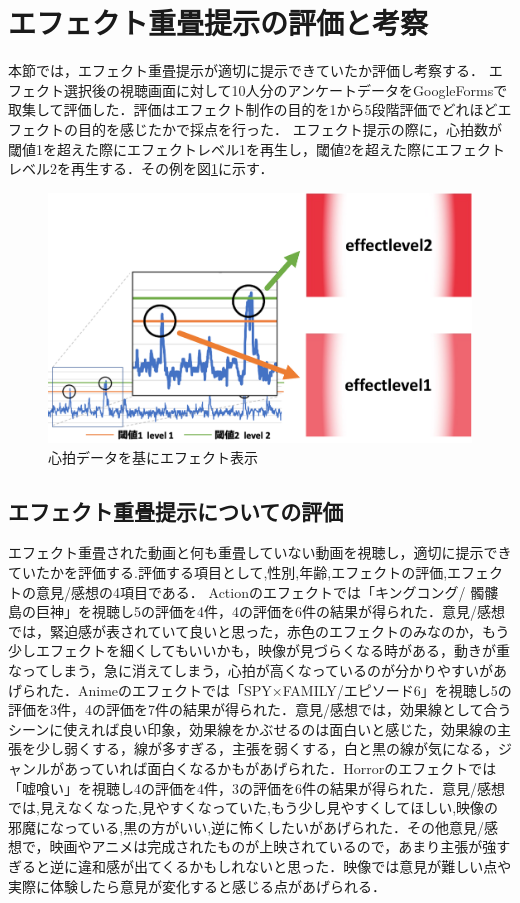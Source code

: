 \section{エフェクト重畳提示の評価と考察}
本節では，エフェクト重畳提示が適切に提示できていたか評価し考察する．
エフェクト選択後の視聴画面に対して10人分のアンケートデータをGoogleFormsで取集して評価した．評価はエフェクト制作の目的を1から5段階評価でどれほどエフェクトの目的を感じたかで採点を行った．
エフェクト提示の際に，心拍数が閾値1を超えた際にエフェクトレベル1を再生し，閾値2を超えた際にエフェクトレベル2を再生する．その例を図\ref{efecthyouka}に示す．
 
\begin{figure}[H]
   \centering
   \includegraphics[width=13cm]{images/chapter4/effectupp.pdf}
   \caption{心拍データを基にエフェクト表示}
   \label{efecthyouka}
\end{figure}
 
\subsection{エフェクト重畳提示についての評価}
 
エフェクト重畳された動画と何も重畳していない動画を視聴し，適切に提示できていたかを評価する.評価する項目として,性別,年齢,エフェクトの評価,エフェクトの意見/感想の4項目である．
Actionのエフェクトでは「キングコング/ 髑髏島の巨神」を視聴し5の評価を4件，4の評価を6件の結果が得られた．意見/感想では，緊迫感が表されていて良いと思った，赤色のエフェクトのみなのか，もう少しエフェクトを細くしてもいいかも，映像が見づらくなる時がある，動きが重なってしまう，急に消えてしまう，心拍が高くなっているのが分かりやすいがあげられた．Animeのエフェクトでは「SPY×FAMILY/エピソード6」を視聴し5の評価を3件，4の評価を7件の結果が得られた．意見/感想では，効果線として合うシーンに使えれば良い印象，効果線をかぶせるのは面白いと感じた，効果線の主張を少し弱くする，線が多すぎる，主張を弱くする，白と黒の線が気になる，ジャンルがあっていれば面白くなるかもがあげられた．Horrorのエフェクトでは「嘘喰い」を視聴し4の評価を4件，3の評価を6件の結果が得られた．意見/感想では,見えなくなった,見やすくなっていた,もう少し見やすくしてほしい,映像の邪魔になっている,黒の方がいい,逆に怖くしたいがあげられた．その他意見/感想で，映画やアニメは完成されたものが上映されているので，あまり主張が強すぎると逆に違和感が出てくるかもしれないと思った．映像では意見が難しい点や実際に体験したら意見が変化すると感じる点があげられる．
 

